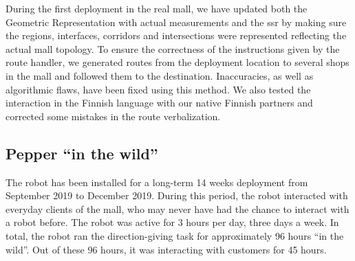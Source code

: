 During the first deployment in the real mall, we have updated both the Geometric Representation with actual measurements and the \acrfull{ssr} by making sure the regions, interfaces, corridors and intersections were represented reflecting the actual mall topology. To ensure the correctness of the instructions given by the route handler, we generated routes from the deployment location to several shops in the mall and followed them to the destination. Inaccuracies, as well as algorithmic flaws, have been fixed using this method. We also tested the interaction in the Finnish language with our native Finnish partners and corrected some mistakes in the route verbalization.

\subsection{Pepper ``in the wild''}

The robot has been installed for a long-term 14 weeks deployment from September 2019 to December 2019. During this period, the robot interacted with everyday clients of the mall, who may never have had the chance to interact with a robot before. The robot was active for 3 hours per day, three days a week. In total, the robot ran the direction-giving task for approximately 96 hours ``in the wild''. Out of these 96 hours, it was interacting with customers for 45 hours.